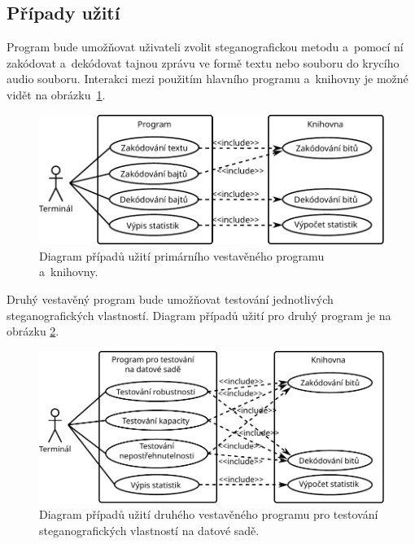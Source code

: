 \subsection*{Případy užití}
\label{sub:use-cases}

Program bude umožňovat uživateli zvolit steganografickou metodu a~pomocí ní
zakódovat a~dekódovat tajnou zprávu ve formě textu nebo souboru do krycího
audio souboru. Interakci mezi použitím hlavního programu a~knihovny je možné
vidět na obrázku~\ref{pic:use-case-diagram-main}.

\begin{figure}[hbt]
    \centering
    \includegraphics[width=\textwidth]{obrazky/use-case-diagram-1.pdf}
    \caption{Diagram případů užití primárního vestavěného programu a~knihovny.}
    \label{pic:use-case-diagram-main}
\end{figure}

Druhý vestavěný program bude umožňovat testování jednotlivých steganografických
vlastností. Diagram případů užití pro druhý program je na obrázku
\ref{pic:use-case-diagram-testing}.

\begin{figure}[hbt]
    \centering
    \includegraphics[width=\textwidth]{obrazky/use-case-diagram-2.pdf}
    \caption{Diagram případů užití druhého vestavěného programu pro testování
    steganografických vlastností na datové sadě.}
    \label{pic:use-case-diagram-testing}
\end{figure}

